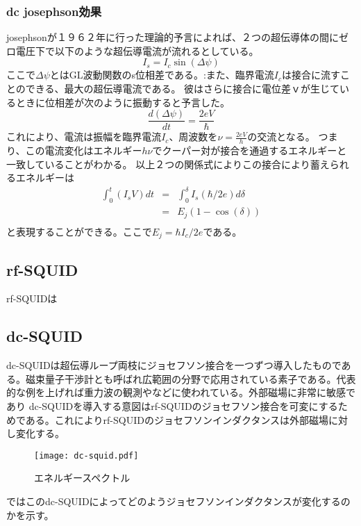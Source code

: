             \subsubsection{dc josephson効果}
                josephsonが１９６２年に行った理論的予言によれば、２つの超伝導体の間にゼロ電圧下で以下のような超伝導電流が流れるとしている。
                \begin{equation*}
                    I_s = I_c \sin(\Delta \psi)
                \end{equation*}
                ここで$\Delta \psi$とはGL波動関数のs位相差である。:また、臨界電流$I_c$は接合に流すことのできる、最大の超伝導電流である。
                彼はさらに接合に電位差ｖが生じているときに位相差が次のように振動すると予言した。
                \begin{equation*}
                    \frac{d(\Delta \psi)}{dt} = \frac{2eV}{\hbar}
                \end{equation*}
                これにより、電流は振幅を臨界電流$I_c$、周波数を$\nu = \frac{2eV}{h}$の交流となる。
                つまり、この電流変化はエネルギー$h\nu$でクーパー対が接合を通過するエネルギーと一致していることがわかる。
                以上２つの関係式によりこの接合により蓄えられるエネルギーは
                \begin{eqnarray}
                    \int_0^{t} (I_s V)dt&=&\int_{0}^{\delta} I_s(\hbar/2e)d\delta\\
                    &=&E_j(1-\cos (\delta))\\
                \end{eqnarray}
                と表現することができる。ここで$E_j=\hbar I_c/2e$である。
    \subsection{rf-SQUID}
                rf-SQUIDは
    \subsection{dc-SQUID}
        dc-SQUIDは超伝導ループ両枝にジョセフソン接合を一つずつ導入したものである。磁束量子干渉計とも呼ばれ広範囲の分野で応用されている素子である。代表的な例を上げれば重力波の観測やなどに使われている。外部磁場に非常に敏感であり
        dc-SQUIDを導入する意図はrf-SQUIDのジョセフソン接合を可変にするためである。これによりrf-SQUIDのジョセフソンインダクタンスは外部磁場に対し変化する。
        \begin{figure}[H]
            \centering
            \texttt{[image: dc-squid.pdf]}
            \caption{エネルギースペクトル}
        \end{figure}
        ではこのdc-SQUIDによってどのようジョセフソンインダクタンスが変化するのかを示す。
